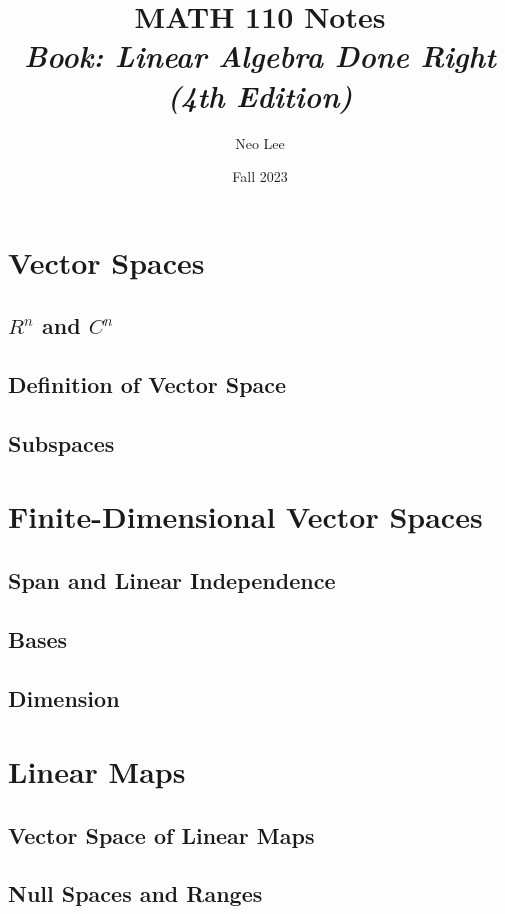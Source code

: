 \documentclass{book}
\title{\Huge{MATH 110 Notes}\\\emph{Book: Linear Algebra Done Right (4th Edition)}}
\author{\huge{Neo Lee}}
\date{\huge{Fall 2023}}
\begin{document}
\maketitle
\let\cleardoublepage\clearpage
{}
\tableofcontents

\chapter{Vector Spaces}
\section{$R^n$ and $C^n$}
\section{Definition of Vector Space}
\section{Subspaces}



\chapter{Finite-Dimensional Vector Spaces}
\section{Span and Linear Independence}
\section{Bases}
\section{Dimension}





\chapter{Linear Maps}
\section{Vector Space of Linear Maps}
\section{Null Spaces and Ranges}
\end{document}
